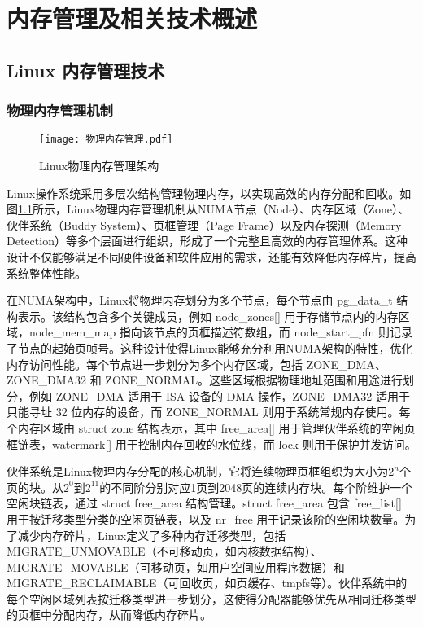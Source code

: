 \chapter{内存管理及相关技术概述}

\section{Linux 内存管理技术}

\subsection{物理内存管理机制}

\begin{figure}[h]
    \centering
    \texttt{[image: 物理内存管理.pdf]}
    \caption{Linux物理内存管理架构}
    \label{物理内存管理}
\end{figure}

Linux操作系统采用多层次结构管理物理内存，以实现高效的内存分配和回收。如图\ref{物理内存管理}所示，Linux物理内存管理机制从NUMA节点（Node）、内存区域（Zone）、伙伴系统（Buddy System）、页框管理（Page Frame）以及内存探测（Memory Detection）等多个层面进行组织，形成了一个完整且高效的内存管理体系。这种设计不仅能够满足不同硬件设备和软件应用的需求，还能有效降低内存碎片，提高系统整体性能。

在NUMA架构中，Linux将物理内存划分为多个节点，每个节点由 pg\_data\_t 结构表示。该结构包含多个关键成员，例如 node\_zones[] 用于存储节点内的内存区域，node\_mem\_map 指向该节点的页框描述符数组，而 node\_start\_pfn 则记录了节点的起始页帧号。这种设计使得Linux能够充分利用NUMA架构的特性，优化内存访问性能。每个节点进一步划分为多个内存区域，包括 ZONE\_DMA、ZONE\_DMA32 和 ZONE\_NORMAL。这些区域根据物理地址范围和用途进行划分，例如 ZONE\_DMA 适用于 ISA 设备的 DMA 操作，ZONE\_DMA32 适用于只能寻址 32 位内存的设备，而 ZONE\_NORMAL 则用于系统常规内存使用。每个内存区域由 struct zone 结构表示，其中 free\_area[] 用于管理伙伴系统的空闲页框链表，watermark[] 用于控制内存回收的水位线，而 lock 则用于保护并发访问。

伙伴系统是Linux物理内存分配的核心机制，它将连续物理页框组织为大小为\(2^n\)个页的块。从\(2^0\)到\(2^{11}\)的不同阶分别对应1页到2048页的连续内存块。每个阶维护一个空闲块链表，通过 struct free\_area 结构管理。struct free\_area 包含 free\_list[] 用于按迁移类型分类的空闲页链表，以及 nr\_free 用于记录该阶的空闲块数量。为了减少内存碎片，Linux定义了多种内存迁移类型，包括 MIGRATE\_UNMOVABLE（不可移动页，如内核数据结构）、MIGRATE\_MOVABLE（可移动页，如用户空间应用程序数据）和 MIGRATE\_RECLAIMABLE（可回收页，如页缓存、tmpfs等）。伙伴系统中的每个空闲区域列表按迁移类型进一步划分，这使得分配器能够优先从相同迁移类型的页框中分配内存，从而降低内存碎片。


